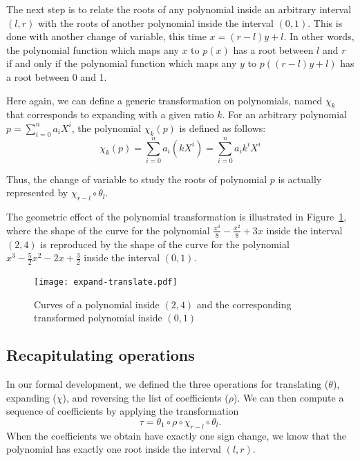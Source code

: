 \documentclass{mscs}
\begin{document}
The next step is to relate the roots of any polynomial inside an
arbitrary interval \((l,r)\) with the roots of another
polynomial inside the interval \((0,1)\).  This is done with another
change of variable, this time \(x= (r-l) y + l\). In other words, the
polynomial function which maps any \(x\) to \(p(x)\) has a root
between \(l\) and \(r\) if and only if the polynomial function which
maps any \(y\) to \(p((r - l) y + l)\) has a root between 0 and 1.

Here again, we can define a generic transformation on polynomials,
named \(\chi_k\) that corresponds to expanding with a given ratio $k$.
For an arbitrary polynomial \(p=\sum_{i=0}^n a_i X^i\), the polynomial
\(\chi_k(p)\) is defined as follows:
\[\chi_k(p) = \sum_{i=0}^n a_i(kX^i) = \sum_{i=0}^n a_ik^i X^i\]

Thus, the change of variable to study the roots of polynomial \(p\)
is actually represented by \(\chi_{r-l}\circ \theta_l\).

The geometric effect of the polynomial transformation
is illustrated in Figure~\ref{expand-translate}, where the shape
of the curve for the polynomial \(\frac{x^3}{8} - \frac{x^2}{8} + 3
x\) inside the interval \((2,4)\) is reproduced by the shape of the
curve for the polynomial \(x^3 -\frac{5}{2}x^2-2x+\frac{3}{2}\) inside
the interval \((0,1)\).
\begin{figure}
\begin{center}
\texttt{[image: expand-translate.pdf]}
\end{center}
\caption{\label{expand-translate} 
Curves of a polynomial inside \((2,4)\) and the
  corresponding transformed polynomial inside \((0,1)\)}
\end{figure}
\subsection{Recapitulating operations}\label{ssec:ops}
In our formal development, we defined the three operations for
translating (\(\theta\)), expanding (\(\chi\)),
 and reversing the list of coefficients (\(\rho\)).  We can then
compute a sequence of coefficients by applying the transformation
\[\tau = \theta_1\circ\rho\circ \chi_{r-l}\circ \theta_{l}.\]
When the coefficients we obtain have exactly one sign change, we
know that the polynomial has exactly one root inside the interval
\((l,r)\).
\end{document}

